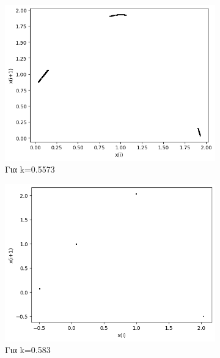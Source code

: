 \begin{figure}[h!]
\begin{subfigure}[b]{0.4\textwidth}
		\includegraphics[width=\textwidth]{LateX images/graphs q03/g11}
		\caption{Για k=0.5573}
		\label{f:k23}
	\end{subfigure}
	\hfill
	\begin{subfigure}[b]{0.4\textwidth}
		\centering
		\includegraphics[width=\textwidth]{LateX images/graphs q03/g12}
		\caption{Για k=0.583}
		\label{f:k24}
	\end{subfigure}
	\hfill
	\begin{subfigure}[b]{0.4\textwidth}
		\centering

\end{subfigure}
\end{figure}
